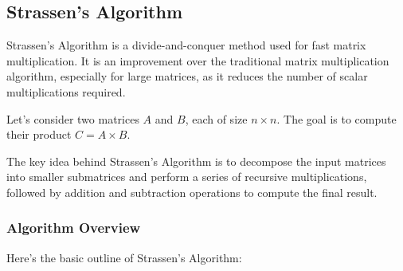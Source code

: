 \documentclass[12pt]{book} %
\begin{document}
\subsection{Strassen's Algorithm}
Strassen's Algorithm is a divide-and-conquer method used for fast matrix multiplication. It is an improvement over the traditional matrix multiplication algorithm, especially for large matrices, as it reduces the number of scalar multiplications required.

Let's consider two matrices $A$ and $B$, each of size $n \times n$. The goal is to compute their product $C = A \times B$.

The key idea behind Strassen's Algorithm is to decompose the input matrices into smaller submatrices and perform a series of recursive multiplications, followed by addition and subtraction operations to compute the final result.

\subsubsection{Algorithm Overview}
Here's the basic outline of Strassen's Algorithm:
\end{document}
